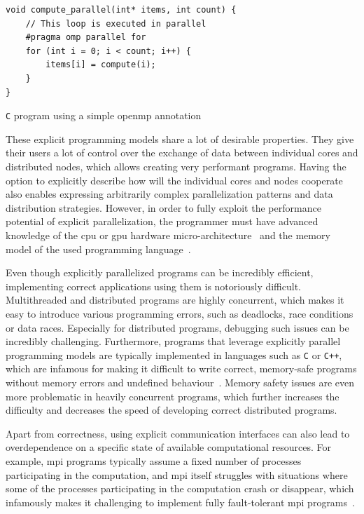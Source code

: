 \begin{description}[wide=0pt]
		\begin{listing}
			\begin{verbatim}
void compute_parallel(int* items, int count) {
	// This loop is executed in parallel
	#pragma omp parallel for
	for (int i = 0; i < count; i++) {
		items[i] = compute(i);
	}
}
        	\end{verbatim}
			\caption{\texttt{C} program using a simple \gls{openmp} annotation}
			\label{lst:openmp-annotation}
		\end{listing}
\end{description}

These explicit programming models share a lot of desirable properties. They give their users a lot
of control over the exchange of data between individual cores and distributed nodes, which allows
creating very performant programs. Having the option to explicitly describe how will the individual
cores and nodes cooperate also enables expressing arbitrarily complex parallelization patterns and
data distribution strategies. However, in order to fully exploit the performance potential of
explicit parallelization, the programmer must have advanced knowledge of the \gls{cpu}
or \gls{gpu} hardware micro-architecture~\cite{intel_developer_manual} and the memory model
of the used programming language~\cite{cpp11_standard}.

Even though explicitly parallelized programs can be incredibly efficient, implementing correct
applications using them is notoriously difficult. Multithreaded and distributed programs are highly
concurrent, which makes it easy to introduce various programming errors, such as deadlocks, race
conditions or data races. Especially for distributed programs, debugging such issues can be
incredibly challenging. Furthermore, programs that leverage explicitly parallel programming models
are typically implemented in languages such as \texttt{C} or \texttt{C++},
which are infamous for making it difficult to write correct, memory-safe programs without memory
errors and undefined behaviour~\cite{memory_safety_report}. Memory safety issues are even more
problematic in heavily concurrent programs, which further increases the difficulty and decreases
the speed of developing correct distributed programs.

Apart from correctness, using explicit communication interfaces can also lead to overdependence on
a specific state of available computational resources. For example, \gls{mpi} programs
typically assume a fixed number of processes participating in the computation, and
\gls{mpi} itself struggles with situations where some of the processes participating
in the computation crash or disappear, which infamously makes it challenging to implement fully
fault-tolerant \gls{mpi} programs~\cite{fault_tolerant_mpi}.

